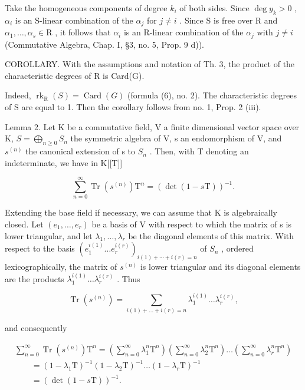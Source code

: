 Take the homogeneous components of degree \(k_i\) of both sides. Since \(\deg y_k > 0\) , \(\alpha_i\) is an S-linear combination of the \(\alpha_j\) for \(j \neq i\) . Since S is free over R and \(\alpha_1, \ldots, \alpha_s \in \mathrm{R}\) , it follows that \(\alpha_i\) is an R-linear combination of the \(\alpha_j\) with \(j \neq i\) (Commutative Algebra, Chap. I, §3, no. 5, Prop. 9 d)).

COROLLARY. With the assumptions and notation of Th. 3, the product of the characteristic degrees of R is Card(G).

Indeed, \(\operatorname{rk}_{\mathrm{R}}(S) = \operatorname{Card}(G)\) (formula (6), no. 2). The characteristic degrees of S are equal to 1. Then the corollary follows from no. 1, Prop. 2 (iii).

Lemma 2. Let K be a commutative field, V a finite dimensional vector space over K, \(S = \bigoplus_{n \geqslant 0} S_n\) the symmetric algebra of V, s an endomorphism of V, and \(s^{(n)}\) the canonical extension of s to \(S_n\) . Then, with T denoting an indeterminate, we have in K{[}{[}T{]}{]}

\[
\sum_ {n = 0} ^ {\infty} \operatorname{Tr} (s ^ {(n)}) \mathrm{T} ^ {n} = (\det (1 - s \mathrm{T})) ^ {- 1}.
\]

Extending the base field if necessary, we can assume that K is algebraically closed. Let \((e_{1},\ldots,e_{r})\) be a basis of V with respect to which the matrix of s is lower triangular, and let \(\lambda_{1},\ldots,\lambda_{r}\) be the diagonal elements of this matrix. With respect to the basis \((e_{1}^{i(1)}\ldots e_{r}^{i(r)})_{i(1)+\cdots+i(r)=n}\) of \(S_{n}\) , ordered lexicographically, the matrix of \(s^{(n)}\) is lower triangular and its diagonal elements are the products \(\lambda_{1}^{i(1)}\ldots\lambda_{r}^{i(r)}\) . Thus

\[
\operatorname{Tr} \left(s ^ {(n)}\right) = \sum_ {i (1) + \dots + i (r) = n} \lambda_ {1} ^ {i (1)} \dots \lambda_ {r} ^ {i (r)},
\]

and consequently

\[
\begin{array}{l} \sum_ {n = 0} ^ {\infty} \operatorname{Tr} (s ^ {(n)}) \mathrm{T} ^ {n} = \left(\sum_ {n = 0} ^ {\infty} \lambda_ {1} ^ {n} \mathrm{T} ^ {n}\right) \left(\sum_ {n = 0} ^ {\infty} \lambda_ {2} ^ {n} \mathrm{T} ^ {n}\right) \ldots \left(\sum_ {n = 0} ^ {\infty} \lambda_ {r} ^ {n} \mathrm{T} ^ {n}\right) \\ \qquad = (1 - \lambda_ {1} \mathrm{T}) ^ {- 1} (1 - \lambda_ {2} \mathrm{T}) ^ {- 1} \ldots (1 - \lambda_ {r} \mathrm{T}) ^ {- 1} \\ \qquad = (\det (1 - s \mathrm{T})) ^ {- 1}. \end{array}
\]


